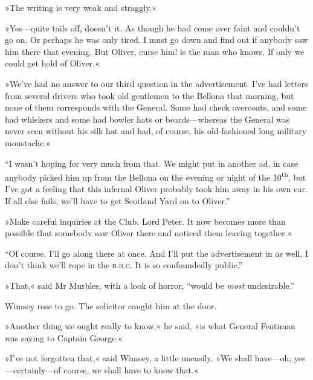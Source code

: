 »The writing is very weak and straggly.«

»Yes\allowbreak---\allowbreak quite tails off, doesn't it. As though he had come over faint and couldn't go on. Or perhaps he was only tired. I must go down and find out if anybody saw him there that evening. But Oliver, curse him! is the man who knows. If only we could get hold of Oliver.«

»We've had no answer to our third question in the advertisement. I've had letters from several drivers who took old gentlemen to the Bellona that morning, but none of them corresponds with the General. Some had check overcoats, and some had whiskers and some had bowler hats or beards\allowbreak---\allowbreak whereas the General was never seen without his silk hat and had, of course, his old-fashioned long military moustache.«

\enquote{I wasn't hoping for very much from that. We might put in another ad. in case anybody picked him up from the Bellona on the evening or night of the  10\textsuperscript{th}, but I've got a feeling that this infernal Oliver probably took him away in his own car. If all else fails, we'll have to get Scotland Yard on to Oliver.}

»Make careful inquiries at the Club, Lord Peter. It now becomes more than possible that somebody saw Oliver there and noticed them leaving together.«

\enquote{Of course. I'll go along there at once. And I'll put the advertisement in as well. I don't think we'll rope in the \textsc{b.b.c.} It is so confoundedly public.}

»That,« said Mr Murbles, with a look of horror, \enquote{would be \textit{most} undesirable.}

Wimsey rose to go. The solicitor caught him at the door.

»Another thing we ought really to know,« he said, »is what General Fentiman was saying to Captain George.«

»I've not forgotten that,« said Wimsey, a little uneasily. »We shall have\allowbreak---\allowbreak oh, yes\allowbreak---\allowbreak certainly\allowbreak---\allowbreak of course, we shall have to know that.«